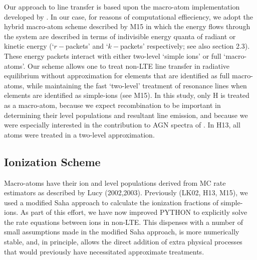\documentclass[useAMS,usenatbib]{mn2e_x}
\begin{document}
Our approach to line transfer is based upon the macro-atom implementation developed by \cite{lucy2002, lucy2003}. In our case, for reasons of computational effieciency, we adopt the  hybrid macro-atom scheme 
described by M15 
in which the energy flows
through the system are described in terms of indivisible
energy quanta of radiant or kinetic energy 
(`$r-$packets' and `$k-$packets' respectively; see also section 2.3).
These energy packets interact with either two-level `simple ions'
or full `macro-atoms'. 
Our scheme allows one to treat non-LTE line transfer in radiative equilibrium
without approximation for elements that are identified as 
full macro-atoms, while maintaining the fast `two-level' 
treatment of resonance lines when elements are identified 
as simple-ions (see M15). In this study,
only H is treated as a macro-atom, because 
we expect recombination to be important
in determining their level populations and resultant line emission, and because we were especially interested in the contribution to AGN spectra of \LA.  In H13, all atoms were treated in a two-level approximation.

\subsection{Ionization Scheme}

Macro-atoms have their ion and level populations derived from
MC rate estimators as described by Lucy (2002,2003). Previously (LK02, H13, M15),
we used a modified Saha approach to calculate the ionization fractions
of simple-ions. As part of  this effort, we have now improved {\sc PYTHON} to explicitly solve the 
rate equations between ions in non-LTE. This dispenses with a number of small assumptions 
made in the modified Saha approach, is more numerically stable, and, in principle, allows 
the direct addition of extra physical processes that would previously have necessitated 
approximate treatments.
\end{document}
